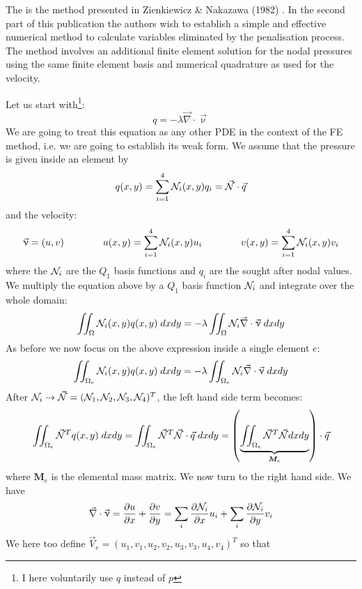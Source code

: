 The is the method presented in Zienkiewicz \& Nakazawa (1982) \cite{zina82}. In the second part 
of this publication the authors wish to establish a simple and effective numerical method to calculate 
variables eliminated by the penalisation process. 
The method involves an additional finite element solution for the nodal pressures using 
the same finite element basis and numerical quadrature as used for the velocity.

Let us start with\footnote{I here voluntarily use $q$ instead of $p$}:
\[
q = -\lambda \vec\nabla\cdot \vec\upnu
\]
We are going to treat this equation as any other PDE in the context of the FE method, i.e. 
we are going to establish its weak form. 
We assume that the pressure is given inside an element by
\[
q(x,y) = \sum_{i=1}^4 {\mathcal{N}}_i(x,y) q_i = \vec{{\mathcal{N}}} \cdot \vec{q}
\]
and the velocity:
\[
\vec\upnu = (u,v) 
\qquad 
\qquad 
u(x,y)  = \sum_{i=1}^4 {\mathcal{N}}_i(x,y) u_i
\qquad 
\qquad 
v(x,y)  = \sum_{i=1}^4 {\mathcal{N}}_i(x,y) v_i
\]
where the ${\mathcal{N}}_i$ are the $Q_1$ basis functions and $q_i$ are the sought after nodal values. 
We multiply the equation above by a $Q_1$ basis function ${\mathcal{N}}_i$ and integrate over the whole domain:
\[
\iint_\Omega {\mathcal{N}}_i(x,y) q(x,y) \; dxdy 
= -\lambda \iint_\Omega {\mathcal{N}}_i \vec\nabla\cdot \vec\upnu  \; dx dy
\]
As before we now focus on the above expression inside a single element $e$:
\[
\iint_{\Omega_e} {\mathcal{N}}_i(x,y) q(x,y) \; dxdy = -\lambda \iint_{\Omega_e} {\mathcal{N}}_i \vec\nabla\cdot \vec\upnu \; dx dy
\]
After ${\mathcal{N}}_i \rightarrow \vec{{\mathcal{N}}}=({\mathcal{N}}_1,{\mathcal{N}}_2,{\mathcal{N}}_3,{\mathcal{N}}_4)^T$, the left hand side term becomes:
\[
\iint _{\Omega_e} \vec{{\mathcal{N}}}^T q(x,y) \; dxdy 
=
\iint _{\Omega_e} \vec{{\mathcal{N}}}^T \vec{{\mathcal{N}}} \cdot \vec{q} \; dxdy 
=
\left(\underbrace{\iint _{\Omega_e} \vec{{\mathcal{N}}}^T \vec{{\mathcal{N}}} dxdy}_{{\bm M}_e} \right) \cdot \vec{q}  
\]
where ${\bm M}_e$ is the elemental mass matrix.
We now turn to the right hand side. We have
\[
\vec\nabla\cdot \vec\upnu
= \frac{\partial u}{\partial x}+\frac{\partial v}{\partial y}
= \sum_i \frac{\partial {\mathcal{N}}_i}{\partial x} u_i + \sum_i \frac{\partial {\mathcal{N}}_i}{\partial y} v_i 
\]
We here too define $\vec{V}_e=(u_1,v_1,u_2,v_2,u_3,v_3,u_4,v_4)^T$ so that 

